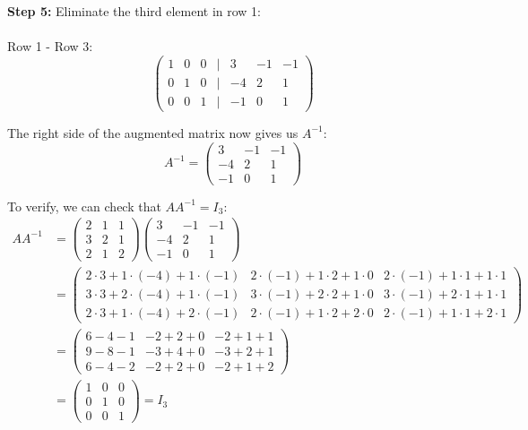 \textbf{Step 5:} Eliminate the third element in row 1:
\\\\
Row 1 - Row 3:
\begin{equation*}
\begin{pmatrix}
1 & 0 & 0 & | & 3 & -1 & -1 \\
0 & 1 & 0 & | & -4 & 2 & 1 \\
0 & 0 & 1 & | & -1 & 0 & 1
\end{pmatrix}
\end{equation*}

The right side of the augmented matrix now gives us \(A^{-1}\):
\begin{equation*}
A^{-1} = 
\begin{pmatrix}
3 & -1 & -1 \\
-4 & 2 & 1 \\
-1 & 0 & 1
\end{pmatrix}
\end{equation*}

To verify, we can check that \(AA^{-1} = I_3\):
\begin{align*}
AA^{-1} &= 
\begin{pmatrix}
2 & 1 & 1 \\
3 & 2 & 1 \\
2 & 1 & 2
\end{pmatrix}
\begin{pmatrix}
3 & -1 & -1 \\
-4 & 2 & 1 \\
-1 & 0 & 1
\end{pmatrix} \\
&= 
\begin{pmatrix}
2 \cdot 3 + 1 \cdot (-4) + 1 \cdot (-1) & 2 \cdot (-1) + 1 \cdot 2 + 1 \cdot 0 & 2 \cdot (-1) + 1 \cdot 1 + 1 \cdot 1 \\
3 \cdot 3 + 2 \cdot (-4) + 1 \cdot (-1) & 3 \cdot (-1) + 2 \cdot 2 + 1 \cdot 0 & 3 \cdot (-1) + 2 \cdot 1 + 1 \cdot 1 \\
2 \cdot 3 + 1 \cdot (-4) + 2 \cdot (-1) & 2 \cdot (-1) + 1 \cdot 2 + 2 \cdot 0 & 2 \cdot (-1) + 1 \cdot 1 + 2 \cdot 1
\end{pmatrix} \\
&= 
\begin{pmatrix}
6 - 4 - 1 & -2 + 2 + 0 & -2 + 1 + 1 \\
9 - 8 - 1 & -3 + 4 + 0 & -3 + 2 + 1 \\
6 - 4 - 2 & -2 + 2 + 0 & -2 + 1 + 2
\end{pmatrix} \\
&= 
\begin{pmatrix}
1 & 0 & 0 \\
0 & 1 & 0 \\
0 & 0 & 1
\end{pmatrix} = I_3
\end{align*}

